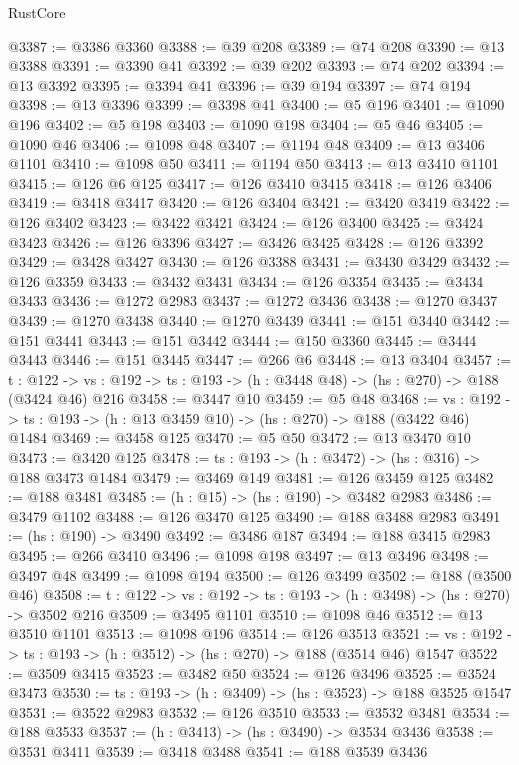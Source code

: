 \begin{lexlean}{RustCore}
\begin{coremodule}
@3387 := @3386 @3360
@3388 := @39 @208
@3389 := @74 @208
@3390 := @13 @3388
@3391 := @3390 @41
@3392 := @39 @202
@3393 := @74 @202
@3394 := @13 @3392
@3395 := @3394 @41
@3396 := @39 @194
@3397 := @74 @194
@3398 := @13 @3396
@3399 := @3398 @41
@3400 := @5 @196
@3401 := @1090 @196
@3402 := @5 @198
@3403 := @1090 @198
@3404 := @5 @46
@3405 := @1090 @46
@3406 := @1098 @48
@3407 := @1194 @48
@3409 := @13 @3406 @1101
@3410 := @1098 @50
@3411 := @1194 @50
@3413 := @13 @3410 @1101
@3415 := @126 @6 @125
@3417 := @126 @3410 @3415
@3418 := @126 @3406
@3419 := @3418 @3417
@3420 := @126 @3404
@3421 := @3420 @3419
@3422 := @126 @3402
@3423 := @3422 @3421
@3424 := @126 @3400
@3425 := @3424 @3423
@3426 := @126 @3396
@3427 := @3426 @3425
@3428 := @126 @3392
@3429 := @3428 @3427
@3430 := @126 @3388
@3431 := @3430 @3429
@3432 := @126 @3359
@3433 := @3432 @3431
@3434 := @126 @3354
@3435 := @3434 @3433
@3436 := @1272 @2983
@3437 := @1272 @3436
@3438 := @1270 @3437
@3439 := @1270 @3438
@3440 := @1270 @3439
@3441 := @151 @3440
@3442 := @151 @3441
@3443 := @151 @3442
@3444 := @150 @3360
@3445 := @3444 @3443
@3446 := @151 @3445
@3447 := @266 @6
@3448 := @13 @3404
@3457 := {t : @122} ->
  {vs : @192} -> {ts : @193} -> (h : @3448 @48) -> (hs : @270) -> @188 (@3424 @46) @216
@3458 := @3447 @10
@3459 := @5 @48
@3468 := {vs : @192} -> {ts : @193} -> (h : @13 @3459 @10) -> (hs : @270) -> @188 (@3422 @46) @1484
@3469 := @3458 @125
@3470 := @5 @50
@3472 := @13 @3470 @10
@3473 := @3420 @125
@3478 := {ts : @193} -> (h : @3472) -> (hs : @316) -> @188 @3473 @1484
@3479 := @3469 @149
@3481 := @126 @3459 @125
@3482 := @188 @3481
@3485 := (h : @15) -> (hs : @190) -> @3482 @2983
@3486 := @3479 @1102
@3488 := @126 @3470 @125
@3490 := @188 @3488 @2983
@3491 := (hs : @190) -> @3490
@3492 := @3486 @187
@3494 := @188 @3415 @2983
@3495 := @266 @3410
@3496 := @1098 @198
@3497 := @13 @3496
@3498 := @3497 @48
@3499 := @1098 @194
@3500 := @126 @3499
@3502 := @188 (@3500 @46)
@3508 := {t : @122} -> {vs : @192} -> {ts : @193} -> (h : @3498) -> (hs : @270) -> @3502 @216
@3509 := @3495 @1101
@3510 := @1098 @46
@3512 := @13 @3510 @1101
@3513 := @1098 @196
@3514 := @126 @3513
@3521 := {vs : @192} -> {ts : @193} -> (h : @3512) -> (hs : @270) -> @188 (@3514 @46) @1547
@3522 := @3509 @3415
@3523 := @3482 @50
@3524 := @126 @3496
@3525 := @3524 @3473
@3530 := {ts : @193} -> (h : @3409) -> (hs : @3523) -> @188 @3525 @1547
@3531 := @3522 @2983
@3532 := @126 @3510
@3533 := @3532 @3481
@3534 := @188 @3533
@3537 := (h : @3413) -> (hs : @3490) -> @3534 @3436
@3538 := @3531 @3411
@3539 := @3418 @3488
@3541 := @188 @3539 @3436

\end{coremodule}
\end{lexlean}

